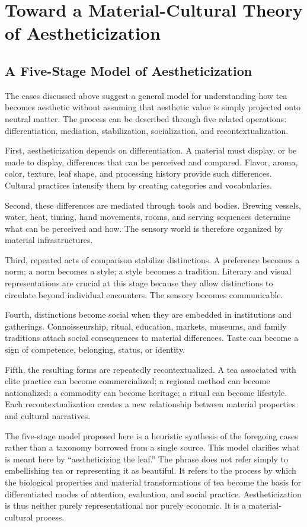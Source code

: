 \documentclass[11pt,a4paper]{article}
\begin{document}
\section{Toward a Material-Cultural Theory of Aestheticization}

\subsection{A Five-Stage Model of Aestheticization}

The cases discussed above suggest a general model for understanding how tea becomes aesthetic without assuming that aesthetic value is simply projected onto neutral matter. The process can be described through five related operations: differentiation, mediation, stabilization, socialization, and recontextualization.

First, aestheticization depends on differentiation. A material must display, or be made to display, differences that can be perceived and compared. Flavor, aroma, color, texture, leaf shape, and processing history provide such differences. Cultural practices intensify them by creating categories and vocabularies.

Second, these differences are mediated through tools and bodies. Brewing vessels, water, heat, timing, hand movements, rooms, and serving sequences determine what can be perceived and how. The sensory world is therefore organized by material infrastructures.

Third, repeated acts of comparison stabilize distinctions. A preference becomes a norm; a norm becomes a style; a style becomes a tradition. Literary and visual representations are crucial at this stage because they allow distinctions to circulate beyond individual encounters. The sensory becomes communicable.

Fourth, distinctions become social when they are embedded in institutions and gatherings. Connoisseurship, ritual, education, markets, museums, and family traditions attach social consequences to material differences. Taste can become a sign of competence, belonging, status, or identity.

Fifth, the resulting forms are repeatedly recontextualized. A tea associated with elite practice can become commercialized; a regional method can become nationalized; a commodity can become heritage; a ritual can become lifestyle. Each recontextualization creates a new relationship between material properties and cultural narratives.

The five-stage model proposed here is a heuristic synthesis of the foregoing cases rather than a taxonomy borrowed from a single source. This model clarifies what is meant here by ``aestheticizing the leaf.'' The phrase does not refer simply to embellishing tea or representing it as beautiful. It refers to the process by which the biological properties and material transformations of tea become the basis for differentiated modes of attention, evaluation, and social practice. Aestheticization is thus neither purely representational nor purely economic. It is a material-cultural process.
\end{document}
